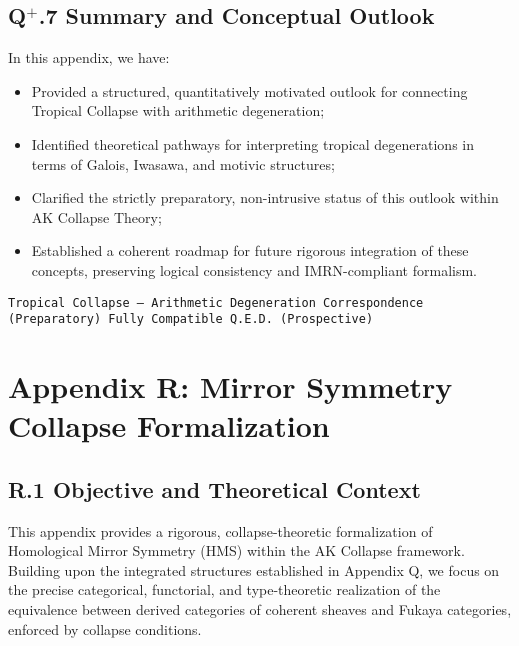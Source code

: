 \documentclass[11pt]{article}
\begin{document}
\subsection*{Q$^{+}$.7 Summary and Conceptual Outlook}

In this appendix, we have:

\begin{itemize}
    \item Provided a structured, quantitatively motivated outlook for connecting Tropical Collapse with arithmetic degeneration;
    \item Identified theoretical pathways for interpreting tropical degenerations in terms of Galois, Iwasawa, and motivic structures;
    \item Clarified the strictly preparatory, non-intrusive status of this outlook within AK Collapse Theory;
    \item Established a coherent roadmap for future rigorous integration of these concepts, preserving logical consistency and IMRN-compliant formalism.
\end{itemize}

\begin{flushright}
\texttt{Tropical Collapse --- Arithmetic Degeneration Correspondence (Preparatory) \quad Fully Compatible \quad Q.E.D. (Prospective)}
\end{flushright}




\section*{Appendix R: Mirror Symmetry Collapse Formalization}

\subsection*{R.1 Objective and Theoretical Context}

This appendix provides a rigorous, collapse-theoretic formalization of Homological Mirror Symmetry (HMS) within the AK Collapse framework. Building upon the integrated structures established in Appendix Q, we focus on the precise categorical, functorial, and type-theoretic realization of the equivalence between derived categories of coherent sheaves and Fukaya categories, enforced by collapse conditions.
\end{document}
